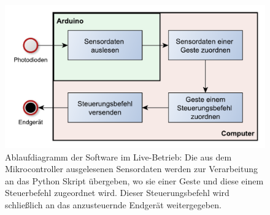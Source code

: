 \begin{figure}[h]
	\centering
	\includegraphics[scale=0.75]{../figures/AblaufSteuerung.pdf}
	\caption{Ablaufdiagramm der Software im Live-Betrieb: Die aus dem Mikrocontroller ausgelesenen Sensordaten werden zur Verarbeitung an das Python Skript übergeben, wo sie einer Geste und diese einem Steuerbefehl zugeordnet wird. Dieser Steuerungsbefehl wird schließlich an das anzusteuernde Endgerät weitergegeben.}
	\label{fig:AblaufSteuerung}
\end{figure}